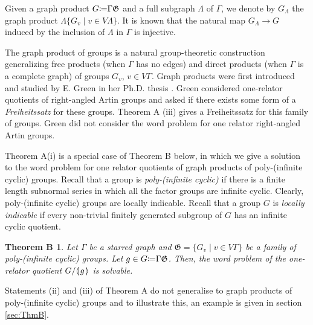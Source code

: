 \documentclass[12pt, a4paper]{amsart}
\newtheorem*{ThmB}{Theorem B}
\theoremstyle{remark}
\theoremstyle{definition}
\begin{document}
Given a graph product $G{\mathrel{\mathop\mathchar"303A}\mkern-1.2mu=} {\Gamma} \mathfrak{G}$ and a full subgraph $\Lambda$ of ${\Gamma}$, we denote by $G_\Lambda$ the graph product $\Lambda \{G_v\mid v\in V\Lambda\}$. It is known that the natural map $G_\Lambda\to G$ induced by the inclusion of $\Lambda$ in ${\Gamma}$ is injective.

The graph product of groups is a natural group-theoretic construction generalizing free products (when ${\Gamma}$ has no edges) and direct products (when ${\Gamma}$ is a complete graph) of groups $G_v$, $v \in V{\Gamma}$. Graph products were first introduced and studied by E. Green in her Ph.D. thesis \cite{Green}. Green considered one-relator quotients of right-angled Artin groups and asked if there exists some form of a \emph{Freiheitssatz} for these groups. Theorem A (iii) gives a Freiheitssatz for this family of groups. Green did not consider the word problem for one relator right-angled Artin groups.

Theorem A(i) is a special case of Theorem B below, in which we give a solution to the word problem for one relator quotients of graph products of poly-(infinite cyclic) groups. Recall that a group is \emph{poly-(infinite cyclic)} if there is a finite length subnormal series in which  all the factor groups are infinite cyclic. Clearly, poly-(infinite cyclic) groups are locally indicable. Recall that a group $G$ is {\it locally indicable} if every non-trivial finitely generated subgroup of $G$ has an infinite cyclic quotient.

\begin{ThmB} Let $\Gamma$ be a starred graph and $\mathfrak{G}=\{G_v\mid v\in V{\Gamma}\}$ be a family of poly-(infinite cyclic) groups.  Let $g\in G{\mathrel{\mathop\mathchar"303A}\mkern-1.2mu=} {\Gamma} \mathfrak{G}$. Then, the word problem  of the  one-relator quotient $G/{{{\langle}{\mkern-3.7mu}{\lvert}{\mkern1.2mu}{{g}}{\mkern1.2mu}{\rvert}{\mkern-3.7mu}{\rangle}}}$ is solvable.
\end{ThmB} 

Statements (ii) and (iii) of Theorem A do not generalise to graph products of poly-(infinite cyclic) groups and to illustrate this,  an example is given in section \ref{sec:ThmB}. 
\end{document}
